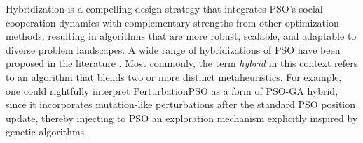 {%








Hybridization is a compelling design strategy that integrates PSO’s social cooperation dynamics with complementary strengths from other optimization methods, resulting in algorithms that are more robust, scalable, and adaptable to diverse problem landscapes.
A wide range of hybridizations of PSO have been proposed in the literature \citep[see, e.g.,][]{chauhan2025learning,abualigah2025particle,urbanczyk2025sequential}.
Most commonly, the term \textit{hybrid} in this context refers to an algorithm that blends two or more distinct \glspl{metaheuristic}.
For example, one could rightfully interpret PerturbationPSO as a form of PSO-GA hybrid,
since it incorporates mutation\-\mbox{-like} perturbations after the standard PSO position update, thereby injecting to PSO an exploration mechanism explicitly inspired by genetic algorithms.


}
